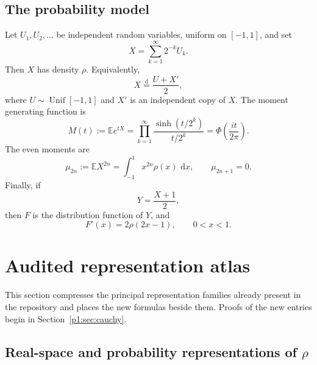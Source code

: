\documentclass[11pt]{article}
\theoremstyle{definition}
\theoremstyle{remark}
\newcommand{\E}{\mathbb E}
\newcommand{\dd}{\,\mathrm d}
\begin{document}
\subsection{The probability model}

Let \(U_1,U_2,\dots\) be independent random variables, uniform on \([-1,1]\), and set
\begin{equation}
 X=\sum_{k=1}^{\infty}2^{-k}U_k.                              \label{p1:eq:X-series}
\end{equation}
Then \(X\) has density \(\rho\).  Equivalently,
\begin{equation}
 X\overset{\mathrm d}=\frac{U+X'}2,                           \label{p1:eq:X-fixed-point}
\end{equation}
where \(U\sim\operatorname{Unif}[-1,1]\) and \(X'\) is an independent copy of \(X\).
The moment generating function is
\begin{equation}
 M(t):=\E e^{tX}
 =\prod_{k=1}^{\infty}\frac{\sinh(t/2^k)}{t/2^k}
 =\Phi\!\left(\frac{it}{2\pi}\right).                       \label{p1:eq:M-product}
\end{equation}
The even moments are
\begin{equation}
 \mu_{2n}:=\E X^{2n}=\int_{-1}^{1}x^{2n}\rho(x)\,\dd x,
 \qquad \mu_{2n+1}=0.                                      \label{p1:eq:moments}
\end{equation}
Finally, if
\begin{equation}
 Y=\frac{X+1}{2},                                             \label{p1:eq:Y-affine}
\end{equation}
then \(F\) is the distribution function of \(Y\), and
\begin{equation}
 F'(x)=2\rho(2x-1),\qquad 0<x<1.                              \label{p1:eq:F-density}
\end{equation}

\section{Audited representation atlas}

This section compresses the principal representation families already present in the
repository and places the new formulas beside them.  Proofs of the new entries begin in
Section~\ref{p1:sec:cauchy}.

\subsection{Real-space and probability representations of \(\rho\)}
\end{document}
